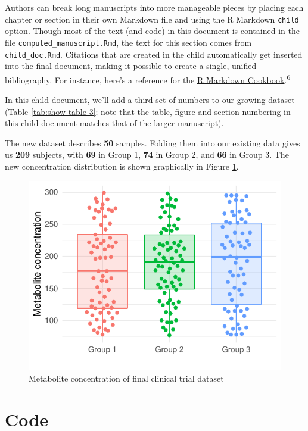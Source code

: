 \documentclass[smallextended]{svjour3}       %
\begin{document}
Authors can break long manuscripts into more manageable pieces by placing each chapter or section in their own Markdown file and using the R Markdown \texttt{child} option. Though most of the text (and code) in this document is contained in the file \texttt{computed\_manuscript.Rmd}, the text for this section comes from \texttt{child\_doc.Rmd}. Citations that are created in the child automatically get inserted into the final document, making it possible to create a single, unified bibliography. For instance, here's a reference for the \href{https://bookdown.org/yihui/rmarkdown-cookbook/}{R Markdown Cookbook}.\textsuperscript{6}

In this child document, we'll add a third set of numbers to our growing dataset (Table \ref{tab:show-table-3}; note that the table, figure and section numbering in this child document matches that of the larger manuscript).

The new dataset describes \textbf{50} samples. Folding them into our existing data gives us \textbf{209} subjects, with \textbf{69} in Group 1, \textbf{74} in Group 2, and \textbf{66} in Group 3. The new concentration distribution is shown graphically in Figure \ref{fig:plot-data-2}.

\begin{figure}
\centering
\includegraphics{computed_manuscript_files/figure-latex/plot-data-2-1.pdf}
\caption{\label{fig:plot-data-2}Metabolite concentration of final clinical trial dataset}
\end{figure}

\hypertarget{code}{%
\section{Code}\label{code}}
\end{document}
